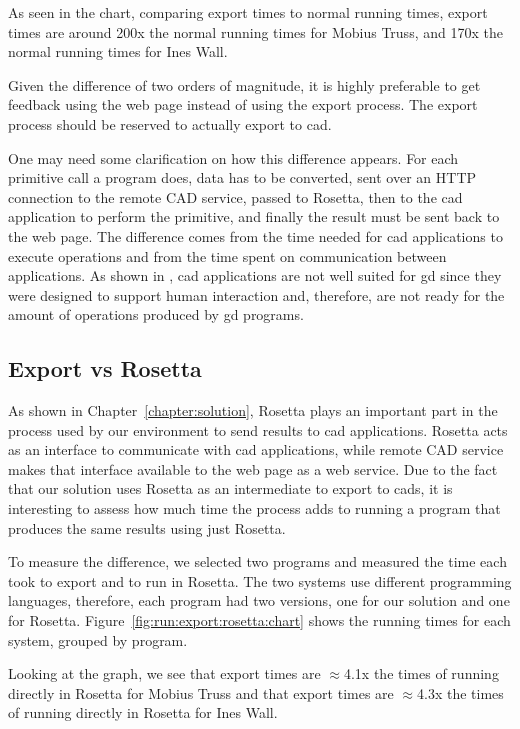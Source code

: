 As seen in the chart, comparing export times to normal running times, export times are around 200x the normal running times for Mobius Truss, and 170x the normal running times for Ines Wall.

Given the difference of two orders of magnitude, it is highly preferable to get feedback using the web page instead of using the export process.
The export process should be reserved to actually export to \gls{cad}.

One may need some clarification on how this difference appears.
For each primitive call a program does, data has to be converted, sent over an HTTP connection to the remote CAD service, passed to Rosetta, then to the \gls{cad} application to perform the primitive, and finally the result must be sent back to the web page.
The difference comes from the time needed for \gls{cad} applications to execute operations and from the time spent on communication between applications.
As shown in \cite{Leitao2014illustrated}, \gls{cad} applications are not well suited for \gls{gd} since they were designed to support human interaction and, therefore, are not ready for the amount of operations produced by \gls{gd} programs.


\subsection{Export vs Rosetta}
As shown in Chapter~\ref{chapter:solution}, Rosetta plays an important part in the process used by our environment to send results to \gls{cad} applications.
Rosetta acts as an interface to communicate with \gls{cad} applications, while remote CAD service makes that interface available to the web page as a web service.
Due to the fact that our solution uses Rosetta as an intermediate to export to \glspl{cad}, it is interesting to assess how much time the process adds to running a program that produces the same results using just Rosetta.

To measure the difference, we selected two programs and measured the time each took to export and to run in Rosetta.
The two systems use different programming languages, therefore, each program had two versions, one for our solution and one for Rosetta.
Figure~\ref{fig:run:export:rosetta:chart} shows the running times for each system, grouped by program.

Looking at the graph, we see that export times are $\approx$4.1x the times of running directly in Rosetta for Mobius Truss and that export times are $\approx$4.3x the times of running directly in Rosetta for Ines Wall.


